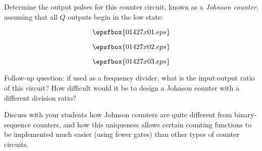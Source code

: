 

Determine the output pulses for this counter circuit, known as a {\it Johnson counter}, assuming that all $Q$ outputs begin in the low state:

$$\epsfbox{01427x01.eps}$$

$$\epsfbox{01427x02.eps}$$







$$\epsfbox{01427x03.eps}$$

\vskip 10pt

Follow-up question: if used as a frequency divider, what is the input:output ratio of this circuit?  How difficult would it be to design a Johnson counter with a different division ratio?







Discuss with your students how Johnson counters are quite different from binary-sequence counters, and how this uniqueness allows certain counting functions to be implemented much easier (using fewer gates) than other types of counter circuits.





